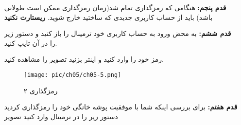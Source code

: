 \begin{enumerate}
\begin{flushleft}
	\end{flushleft}
	\begin{example}
اگر به تصویر 
\ref{pic-38}
دقت کنید متوجه خواهید که نام کاربری پیش فرض ما
\textbf{linuxfedora}
است پس ما به جای کلمه 
\textbf{user}
نام کاربری خود را مینویسیم همانند تصویر
\ref{pic-40}
	\end{example}
\begin{figure}[H]%
	\caption{رمزگذاری}
	\begin{center}
		\texttt{[image: pic/ch05/ch05-4.png]}
	\end{center}
	\label{pic-40}
\end{figure}	
\item[\textbf{قدم پنجم:}] 
هنگامی که رمزگذاری تمام شد(زمان رمزگذاری ممکن است طولانی باشد) باید از حساب کاربری جدیدی که ساختید خارج شوید.
\textbf{ریستارت نکنید}
\item[\textbf{قدم ششم:}] 
به محض ورود به حساب کاربری خود ترمینال را باز کنید و دستور زیر را در آن تایپ کنید.
	\begin{flushleft}
\end{flushleft}
رمز خود را وارد کنید و اینتر بزنید تصویر 
را مشاهده کنید.
\begin{figure}[H]%
	\caption{رمزگذاری ۲}
	\begin{center}
		\texttt{[image: pic/ch05/ch05-5.png]}
	\end{center}
	\label{pic-41}
\end{figure}
\item[\textbf{قدم هفتم:}] 
برای بررسی اینکه شما با موفقیت پوشه خانگی خود را رمزگذاری کردید دستور زیر را در ترمینال وارد کنید تصویر


\end{enumerate}
